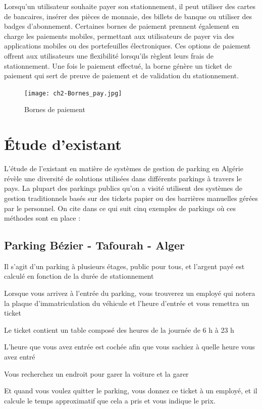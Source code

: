 Lorsqu'un utilisateur souhaite payer son stationnement, il peut utiliser des cartes de bancaires, insérer des pièces de monnaie, des billets de banque ou utiliser des badges d'abonnement. Certaines bornes de paiement prennent également en charge les paiements mobiles, permettant aux utilisateurs de payer via des applications mobiles ou des portefeuilles électroniques. Ces options de paiement offrent aux utilisateurs une flexibilité lorsqu'ils règlent leurs frais de stationnement.
Une fois le paiement effectué, la borne génère un ticket de paiement qui sert de preuve de paiement et de validation du stationnement.

\begin{figure}[H]
	\centering
	\texttt{[image: ch2-Bornes\_pay.jpg]}
	\caption{ Bornes de paiement}
 \label{img1}
\end{figure}

\section{Étude d'existant}

L'étude de l'existant en matière de systèmes de gestion de parking en Algérie révèle une diversité de solutions utilisées dans différents parkings à travers le pays. La plupart des parkings publics qu'on a visité utilisent des systèmes de gestion traditionnels basés sur des tickets papier ou des barrières manuelles gérées par le personnel.
On cite dans ce qui suit cinq exemples de parkings où ces méthodes sont en place :
\subsection{Parking Bézier - Tafourah - Alger}



Il s'agit d'un parking à plusieurs étages, public pour tous, et l'argent payé est calculé en fonction de la durée de stationnement

Lorsque vous arrivez à l'entrée du parking, vous trouverez un employé qui notera la plaque d'immatriculation du véhicule et l'heure d'entrée et vous remettra un ticket

Le ticket contient un table composé des heures de la journée de 6 h à 23 h

L'heure que vous avez entrée est cochée afin que vous sachiez à quelle heure vous avez entré

Vous recherchez un endroit pour garer la voiture et la garer

Et quand vous voulez quitter le parking, vous donnez ce ticket à un employé, et il calcule le temps approximatif que cela a pris et vous indique le prix.

